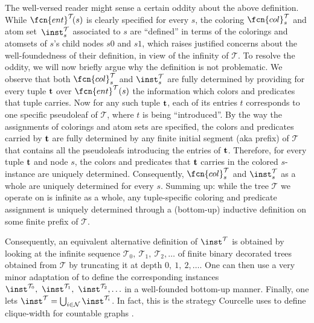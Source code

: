 \begin{remark}
The well-versed reader might sense a certain oddity about the above definition. While $\fcn{ent}^\mathcal{T}\!(s)$ is clearly specified for every $s$, the coloring $\fcn{col}^{\mathcal{T}}_s$ and atom set~$\inst^{\mathcal{T}}_{s}$ associated to $s$ are ``defined'' in terms of the colorings and atomsets of $s$'s  child nodes $s0$ and $s1$, which raises justified concerns about the well-foundedness of their definition, in view of the infinity of $\mathcal{T}$. To resolve the oddity, we will now briefly argue why the definition is not problematic.
We observe that both $\fcn{col}^{\mathcal{T}}_s$ and  $\inst^{\mathcal{T}}_{s}$ are fully determined by providing for every tuple $\bold{t}$ over $\fcn{ent}^\mathcal{T}(s)$ the information which colors and predicates that tuple carries.
Now for any such tuple $\bold{t}$, each of its entries $t$ corresponds to one specific pseudoleaf of $\mathcal{T}$, where $t$ is being ``introduced''. By the way the assignments of colorings and atom sets are specified, the colors and predicates carried by $\bold{t}$ are fully determined by any finite initial segment (aka prefix) of $\mathcal{T}$ that contains all the pseudoleafs introducing the entries of $\bold{t}$. Therefore, for every tuple $\bold{t}$ and node $s$, the colors and predicates that $\bold{t}$ carries in the colored $s$-instance are uniquely determined. Consequently, $\fcn{col}^{\mathcal{T}}_s$ and  $\inst^{\mathcal{T}}_{s}$ as a whole are uniquely determined for every $s$.  
Summing up: while the tree $\mathcal{T}$ we operate on is infinite as a whole, any tuple-specific coloring and predicate assignment is uniquely determined through a (bottom-up) inductive definition on some finite prefix of $\mathcal{T}$.

Consequently, an equivalent alternative definition of $\inst^\mathcal{T}$ is obtained by looking at the infinite sequence $\mathcal{T}_0,\ \mathcal{T}_1,\ \mathcal{T}_2,\ldots$ of finite binary decorated trees obtained from $\mathcal{T}$ by truncating it at depth $0,\ 1,\ 2,\ldots$. One can then use a very minor adaptation of  to define the corresponding instances $\inst^{\mathcal{T}_0},\ \inst^{\mathcal{T}_1},\  \inst^{\mathcal{T}_2},\ldots$ in a well-founded bottom-up manner. Finally, one lets $\inst^\mathcal{T} = \bigcup_{i\in \mathcal{N}}\inst^{\mathcal{T}_i}$. In fact, this is the strategy Courcelle uses to define clique-width for countable graphs \cite{Cou04}. 



\end{remark}
